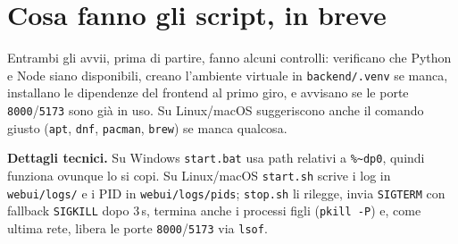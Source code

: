 \section{Cosa fanno gli script, in breve}

Entrambi gli avvii, prima di partire, fanno alcuni controlli:
verificano che Python e Node siano disponibili, creano l'ambiente
virtuale in \texttt{backend/.venv} se manca, installano le
dipendenze del frontend al primo giro, e avvisano se le porte
\texttt{8000}/\texttt{5173} sono gi\`a in uso. Su Linux/macOS
suggeriscono anche il comando giusto (\texttt{apt}, \texttt{dnf},
\texttt{pacman}, \texttt{brew}) se manca qualcosa.

\begin{biblioparvabox}
\textbf{Dettagli tecnici.} Su Windows \texttt{start.bat} usa path
relativi a \texttt{\%\textasciitilde dp0}, quindi funziona ovunque
lo si copi. Su Linux/macOS \texttt{start.sh} scrive i log in
\texttt{webui/logs/} e i PID in \texttt{webui/logs/pids};
\texttt{stop.sh} li rilegge, invia \texttt{SIGTERM} con fallback
\texttt{SIGKILL} dopo 3\,s, termina anche i processi figli
(\texttt{pkill -P}) e, come ultima rete, libera le porte
\texttt{8000}/\texttt{5173} via \texttt{lsof}.
\end{biblioparvabox}
